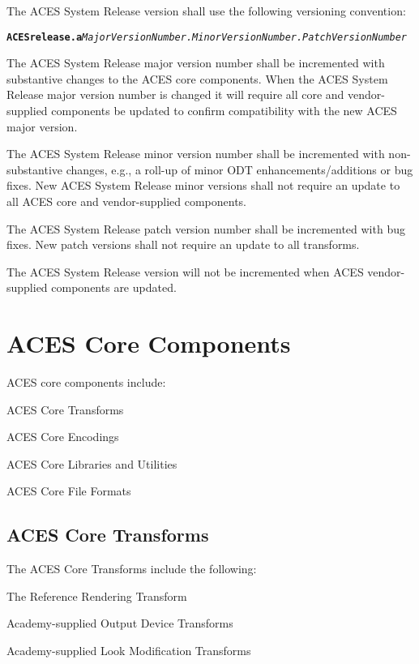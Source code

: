 The ACES System Release version shall use the following versioning convention: 

\texttt{\textbf{ACESrelease.a}\textit{MajorVersionNumber.MinorVersionNumber.PatchVersionNumber}}

The ACES System Release major version number shall be incremented with substantive changes to the ACES core components. When the ACES System Release major version number is changed it will require all core and vendor-supplied components be updated to confirm compatibility with the new ACES major version.

The ACES System Release minor version number shall be incremented with non-substantive changes, e.g., a roll-up of minor ODT enhancements/additions or bug fixes. New ACES System Release minor versions shall not require an update to all ACES core and vendor-supplied components.

The ACES System Release patch version number shall be incremented with bug fixes. New patch versions shall not require an update to all transforms.

The ACES System Release version will not be incremented when ACES vendor-supplied components are updated.

\section{ACES Core Components}
ACES core components include: 

\begin{listize}[-]
	\item ACES Core Transforms
	\item ACES Core Encodings
	\item ACES Core Libraries and Utilities
	\item ACES Core File Formats
\end{listize}

\subsection{ACES Core Transforms}
The ACES Core Transforms include the following:

\begin{listize}[-]
	\item The Reference Rendering Transform
	\item Academy-supplied Output Device Transforms
	\item Academy-supplied Look Modification Transforms
\end{listize}

